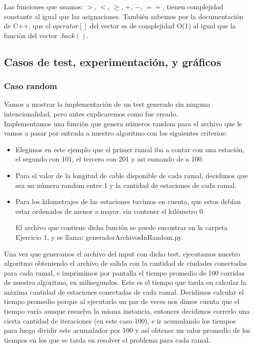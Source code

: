 Las funciones que usamos: $>$, $<$, $\geq$, $+$, $-$, $==$, tienen complejidad constante al igual que las asignaciones. También sabemos por la documentación de C++, que el $operator[]$ del vector es de complejidad O(1) al igual que la función del vector $.back()$.\\

\subsection{Casos de test, experimentación, y gráficos}

\subsubsection{Caso random}
Vamos a mostrar la implementación de un test generado sin ninguna intencionalidad, pero antes explicaremos como fue creado. \\

Implementamos una función que genera números random para el archivo que le vamos a pasar por entrada a nuestro algoritmo con los siguientes criterios:
\begin{itemize}
\item Elegimos en este ejemplo que el primer ramal iba a contar con una estación, el segundo con 101, el tercero con 201 y asi sumando de a 100.
\item Para el valor de la longitud de cable disponible de cada ramal, decidimos que sea un número random entre 1 y la cantidad de estaciones de cada ramal.
\item Para los kilometrajes de las estaciones tuvimos en cuenta, que estos debían estar ordenados de menor a mayor, sin contener el kilómetro 0. 

El archivo que contiene dicha función se puede encontrar en la carpeta Ejercicio 1, y se llama: generadorArchivosInRandom.py.

\end{itemize}

Una vez que generamos el archivo del input con dicho test, ejecutamos nuestro algoritmo obteniendo el archivo de salida con la cantidad de ciudades conectadas para cada ramal, e imprimimos por pantalla el tiempo promedio de 100 corridas de nuestro algoritmo, en milisegundos. Este es el tiempo que tarda en calcular la máxima cantidad de estaciones conectadas de cada ramal. Decidimos calcular el tiempo promedio porque al ejecutarlo un par de veces nos dimos cuenta que el tiempo varía aunque resuelva la misma instancia, entonces decidimos correrlo una cierta cantidad de iteraciones (en este caso 100), e ir acumulando los tiempos para luego dividir este acumulador por 100 y así obtener un valor promedio de los tiempos en los que se tarda en resolver el problema para cada ramal. \\

